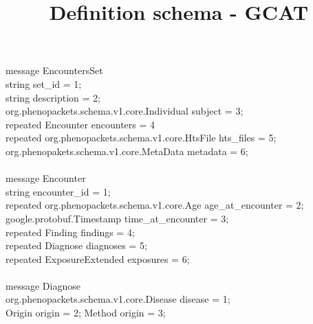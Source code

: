 \documentclass[a4paper, 10pt]{article}
\title{Definition schema - GCAT}
\begin{document}
\date{}
\maketitle








message \colorbox{yellow!80}{EncountersSet} \ {  \\
    string set\_id = 1;\\
    string description = 2;\\
    org.phenopackets.schema.v1.core.Individual subject = 3;\\
    repeated \colorbox{yellow!80}{Encounter} encounters = 4 \\
    repeated org.phenopackets.schema.v1.core.HtsFile hts\_files = 5; \\
    org.phenopakets.schema.v1.core.MetaData metadata = 6; \\

\ } \\
 



message \colorbox{yellow!80}{Encounter} \ { \\ 
    string encounter\_id = 1; \\
    repeated org.phenopackets.schema.v1.core.Age age\_at\_encounter = 2; \\
    google.protobuf.Timestamp time\_at\_encounter = 3; \\
    repeated \colorbox{yellow!80}{Finding} findings = 4; \\
    repeated \colorbox{yellow!80}{Diagnose} diagnoses = 5; \\
    repeated \colorbox{yellow!80}{ExposureExtended} exposures = 6; \\
\ } \\







message \colorbox{yellow!80}{Diagnose} \ { \\   
    org.phenopackets.schema.v1.core.Disease disease = 1; \\
    \colorbox{yellow!80}{Origin} origin = 2;
     \colorbox{yellow!80}{Method} origin = 3;
\ } \\
\end{document}
